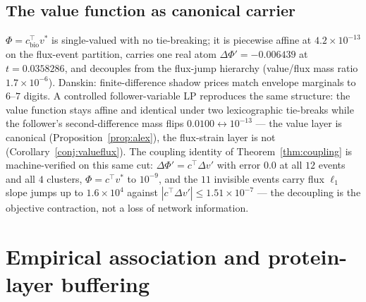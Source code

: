 \documentclass[11pt,a4paper]{article}
\theoremstyle{plain}
\theoremstyle{definition}
\theoremstyle{remark}
\begin{document}
\subsection{The value function as canonical carrier}
\label{sec:v1}
$\Phi = c_{\mathrm{bio}}^\top v^*$ is single-valued with no tie-breaking;
it is piecewise affine at $4.2 \times 10^{-13}$ on the flux-event
partition, carries one real atom
$\Delta\Phi' = -0.006439$ at $t = 0.0358286$, and decouples from the
flux-jump hierarchy (value/flux mass ratio $1.7 \times 10^{-6}$).
Danskin: finite-difference shadow prices match envelope marginals to
$6$--$7$ digits. A controlled follower-variable LP reproduces the same
structure: the value function stays affine and identical under two
lexicographic tie-breaks while the follower's second-difference mass
flips $0.0100 \leftrightarrow 10^{-13}$ --- the value layer is
canonical (Proposition~\ref{prop:alex}), the flux-strain layer is not
(Corollary~\ref{conj:valueflux}). The coupling identity of
Theorem~\ref{thm:coupling} is machine-verified on this same cut:
$\Delta\Phi' = c^\top \Delta v'$ with error $0.0$ at all $12$
events and all $4$ clusters, $\Phi = c^\top v^*$ to $10^{-9}$, and
the $11$ invisible events carry flux $\ell_1$ slope jumps up to
$1.6 \times 10^{4}$ against $|c^\top \Delta v'| \le 1.51 \times
10^{-7}$ --- the decoupling is the objective contraction, not a loss
of network information.

\section{Empirical association and protein-layer buffering}
\label{sec:empirical}
\end{document}
